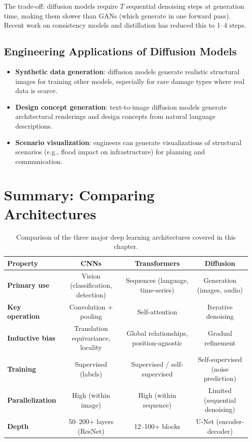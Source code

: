 \documentclass[12pt]{article}
\begin{document}
The trade-off: diffusion models require $T$ sequential denoising steps at generation time, making them slower than GANs (which generate in one forward pass). Recent work on consistency models and distillation has reduced this to 1--4 steps.

\subsection{Engineering Applications of Diffusion Models}

\begin{itemize}
    \item \textbf{Synthetic data generation}: diffusion models generate realistic structural images for training other models, especially for rare damage types where real data is scarce.
    \item \textbf{Design concept generation}: text-to-image diffusion models generate architectural renderings and design concepts from natural language descriptions.
    \item \textbf{Scenario visualization}: engineers can generate visualizations of structural scenarios (e.g., flood impact on infrastructure) for planning and communication.
\end{itemize}

\section{Summary: Comparing Architectures}

\begin{table}[ht]
    \centering
    \small
    \begin{tabulary}{\textwidth}{@{} L C C C @{}}
        \toprule
        \textbf{Property} & \textbf{CNNs} & \textbf{Transformers} & \textbf{Diffusion} \\
        \midrule
        \textbf{Primary use} & Vision (classification, detection) & Sequences (language, time-series) & Generation (images, audio) \\
        \textbf{Key operation} & Convolution + pooling & Self-attention & Iterative denoising \\
        \textbf{Inductive bias} & Translation equivariance, locality & Global relationships, position-agnostic & Gradual refinement \\
        \textbf{Training} & Supervised (labels) & Supervised / self-supervised & Self-supervised (noise prediction) \\
        \textbf{Parallelization} & High (within image) & High (within sequence) & Limited (sequential denoising) \\
        \textbf{Depth} & 50--200+ layers (ResNet) & 12--100+ blocks & U-Net (encoder-decoder) \\
        \bottomrule
    \end{tabulary}
    \caption{Comparison of the three major deep learning architectures covered in this chapter.}
    \label{t13tab:comparison}
\end{table}
\end{document}
